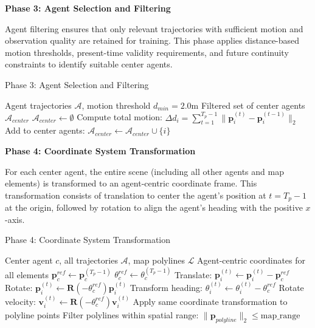 \textbf{Phase 3: Agent Selection and Filtering}

Agent filtering ensures that only relevant trajectories with sufficient motion and observation quality are retained for training. This phase applies distance-based motion thresholds, present-time validity requirements, and future continuity constraints to identify suitable center agents.

\begin{algorithm}[H]
\caption{Phase 3: Agent Selection and Filtering}
\label{alg:phase3_filtering}
\begin{algorithmic}[1]
\REQUIRE Agent trajectories \(\mathcal{A}\), motion threshold \(d_{min} = 2.0\)m
\ENSURE Filtered set of center agents \(\mathcal{A}_{center}\)
\STATE \(\mathcal{A}_{center} \leftarrow \emptyset\)
    \STATE Compute total motion: \(\Delta d_i = \sum_{t=1}^{T_p-1} \|\boldsymbol{p}_i^{(t)} - \boldsymbol{p}_i^{(t-1)}\|_2\)
        \STATE Add to center agents: \(\mathcal{A}_{center} \leftarrow \mathcal{A}_{center} \cup \{i\}\)
    \ENDIF
\ENDFOR
\end{algorithmic}
\end{algorithm}

\textbf{Phase 4: Coordinate System Transformation}

For each center agent, the entire scene (including all other agents and map elements) is transformed to an agent-centric coordinate frame. This transformation consists of translation to center the agent's position at \(t = T_p - 1\) at the origin, followed by rotation to align the agent's heading with the positive \(x\)-axis.

\begin{algorithm}[H]
\caption{Phase 4: Coordinate System Transformation}
\label{alg:phase4_transform}
\begin{algorithmic}[1]
\REQUIRE Center agent \(c\), all trajectories \(\mathcal{A}\), map polylines \(\mathcal{L}\)
\ENSURE Agent-centric coordinates for all elements
\STATE \(\boldsymbol{p}_c^{ref} \leftarrow \boldsymbol{p}_c^{(T_p-1)}\) 
\STATE \(\theta_c^{ref} \leftarrow \theta_c^{(T_p-1)}\) 
    \STATE Translate: \(\boldsymbol{p}_i^{(t)} \leftarrow \boldsymbol{p}_i^{(t)} - \boldsymbol{p}_c^{ref}\)
    \STATE Rotate: \(\boldsymbol{p}_i^{(t)} \leftarrow \mathbf{R}(-\theta_c^{ref}) \boldsymbol{p}_i^{(t)}\)
    \STATE Transform heading: \(\theta_i^{(t)} \leftarrow \theta_i^{(t)} - \theta_c^{ref}\)
    \STATE Rotate velocity: \(\boldsymbol{v}_i^{(t)} \leftarrow \mathbf{R}(-\theta_c^{ref}) \boldsymbol{v}_i^{(t)}\)
\ENDFOR
{}
    \STATE Apply same coordinate transformation to polyline points
    \STATE Filter polylines within spatial range: \(\|\boldsymbol{p}_{polyline}\|_2 \leq \text{map\_range}\)
\ENDFOR
\end{algorithmic}
\end{algorithm}

